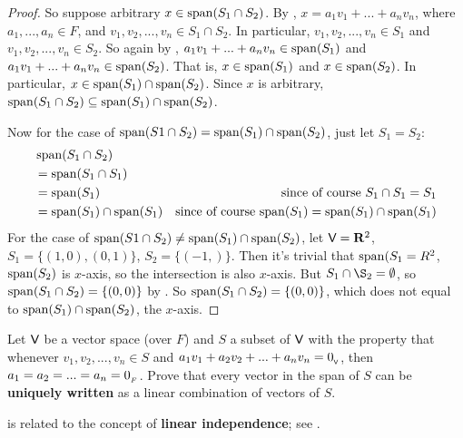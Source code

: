 \begin{proof}
So suppose arbitrary \(x \in \operatorname{span}(S_1 \cap S_2)\).
By , \(x = a_1 v_1 + ... + a_n v_n\), where \(a_1, ..., a_n \in F\), and \(v_1, v_2, ..., v_n \in S_1 \cap S_2\).
In particular, \(v_1, v_2, ..., v_n \in S_1\) and \(v_1, v_2, ..., v_n \in S_2\).
So again by , \(a_1 v_1 + ... + a_n v_n \in \operatorname{span}(S_1)\) and \(a_1 v_1 + ... + a_n v_n \in \operatorname{span}(S_2)\).
That is, \(x \in \operatorname{span}(S_1)\) and \(x \in \operatorname{span}(S_2)\).
In particular, \(x \in \operatorname{span}(S_1) \cap \operatorname{span}(S_2)\).
Since \(x\) is arbitrary, \(\operatorname{span}(S_1 \cap S_2) \subseteq \operatorname{span}(S_1) \cap \operatorname{span}(S_2)\).

Now for the case of \(\operatorname{span}(S1 \cap S_2) = \operatorname{span}(S_1) \cap \operatorname{span}(S_2)\), just let \(S_1 = S_2\):
\begin{align*}
    & \operatorname{span}(S_1 \cap S_2) \\
    & = \operatorname{span}(S_1 \cap S_1) \\
    & = \operatorname{span}(S_1) & \text{since of course \(S_1 \cap S_1 = S_1\)} \\
    & = \operatorname{span}(S_1) \cap \operatorname{span}(S_1) & \text{since of course \(\operatorname{span}(S_1) = \operatorname{span}(S_1) \cap \operatorname{span}(S_1)\)}
\end{align*}
For the case of \(\operatorname{span}(S1 \cap S_2) \ne \operatorname{span}(S_1) \cap \operatorname{span}(S_2)\), let \(\textsf{V} = \mathbf{R}^2\), \(S_1 = \{(1, 0), (0, 1)\}\), \(S_2 = \{(-1, )\}\).
Then it's trivial that \(\operatorname{span}(S_1 = R^2\), \(\operatorname{span}(S_2)\) is \(x\)-axis, so the intersection is also \(x\)-axis.
But \(S_1 \cap \S_2 = \emptyset\), so \(\operatorname{span}(S_1 \cap S_2) = \{ (0, 0) \}\) by .
So \(\operatorname{span}(S_1 \cap S_2) = \{ (0, 0) \}\), which does not equal to \(\operatorname{span}(S_1) \cap \operatorname{span}(S_2)\), the \(x\)-axis.
\end{proof}

\begin{exercise} \label{exercise 1.4.16}
Let \(\textsf{V}\) be a vector space (over \(F\)) and \(S\) a subset of \(\textsf{V}\) with the property that whenever \(v_1, v_2, ..., v_n \in S\) and \(a_1 v_1 + a_2 v_2 + ... + a_n v_n = 0_{_{\textsf{V}}}\), then \(a_1 = a_2 = ... = a_n = 0_{_F}\).
Prove that every vector in the span of \(S\) can be \textbf{uniquely written} as a linear combination of vectors of \(S\).
\end{exercise}

\begin{note}
 is related to the concept of \textbf{linear independence}; see .
\end{note}


